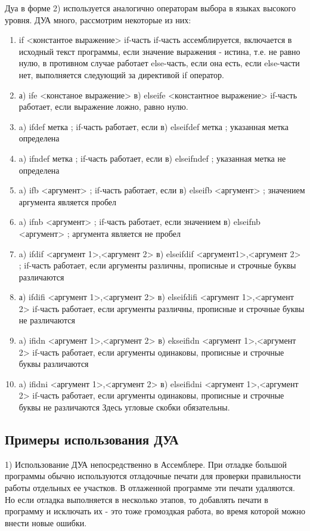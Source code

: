 Дуа в форме 2) используется аналогично операторам выбора в языках высокого уровня. ДУА много, рассмотрим некоторые из них:
\begin{enumerate}
    \item if <константое выражение> if-часть
    if-часть ассемблируется, включается в исходный текст программы, если значение выражения - истина, т.е. не равно нулю, в противном случае работает else-часть, если она есть, если else-части нет, выполняется следующий за директивой if оператор.
    \item а) ife <констаное выражение>
    в) elseife <константное выражение>
    if-часть работает, если выражение ложно, равно нулю.
    \item a) ifdef метка ; if-часть работает, если
    в) elseifdef метка ; указанная метка определена
    \item a) ifndef метка ; if-часть работает, если
    в) elseifndef ; указанная метка не определена
    \item a) ifb <аргумент> ; if-часть работает, если
    в) elseifb <аргумент> ; значением аргумента является пробел
    \item a) ifnb <аргумент> ; if-часть работает, если значением
    в) elseifnb <аргумент> ; аргумента является не пробел
    \item a) ifdif <аргумент 1>,<аргумент 2>
    в) elseifdif <аргумент1>,<аргумент 2> ; if-часть работает, если аргументы различны, прописные и строчные буквы различаются
    \item а) ifdifi <аргумент 1>,<аргумент 2>
    в) elseifdifi <аргумент 1>,<аргумент 2>
    if-часть работает, если аргументы различны, прописные и строчные буквы не различаются
    \item a) ifidn <аргумент 1>,<аргумент 2>
    в) ekseifidn <аргумент 1>,<аргумент 2>
    if-часть работает, если аргументы одинаковы, прописные и строчные буквы различаются
    \item a) ifidni <аргумент 1>,<аргумент 2>
    в) elseifidni <аргумент 1>,<аргумент 2>
    if-часть работает, если аргументы одинаковы, прописные и строчные буквы не различаются
    Здесь угловые скобки обязательны.
\end{enumerate}

\subsection{Примеры использования ДУА}
1) Использование ДУА непосредственно в Ассемблере. При отладке большой программы обычно используются отладочные печати для проверки правильности работы отдельных ее участков. В отлаженной программе эти печати удаляются. Но если отладка выполняется в несколько этапов, то добавлять печати в программу и исключать их -
это тоже громоздкая работа, во время которой можно внести новые ошибки.

